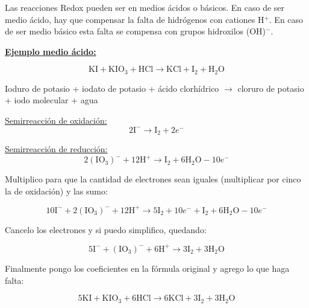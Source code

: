 Las reacciones Redox pueden ser en medios ácidos o básicos. En caso de ser medio ácido, hay que compensar la falta de hidrógenos con cationes H$^+$. En caso de ser medio básico esta falta se compensa con grupos hidroxilos (OH)$^-$.

\skipline
\noindent\textbf{\underline{Ejemplo medio ácido:}}

$$\text{KI} + \text{K} \text{I} \text{O}_3 + \text{H} \text{Cl} \longrightarrow
\text{KCl} + \text{I}_2 +  \text{H}_2 \text{O}$$

\hfil Ioduro de potasio \hfil + \hfil iodato de potasio \hfil + \hfil ácido clorhídrico \hfil
$\rightarrow$ \hfil
cloruro de potasio \hfil + \hfil iodo molecular \hfil + \hfil agua \hfil 

\begin{multicols}{2}

\underline{Semirreacción de oxidación:}
$$2\text{I}^{-} \longrightarrow \text{I}_2 + 2e^-$$

\underline{Semirreacción de reducción:}
$$2(\text{IO}_3)^{-} + 12 \text{H}^+ \longrightarrow \text{I}_2 + 6\text{H}_2 \text{O} - 10e^-$$
\end{multicols}

Multiplico para que la cantidad de electrones sean iguales (multiplicar por cinco la de oxidación) y las sumo:

$$10\text{I}^{-} + 2(\text{IO}_3)^{-} + 12 \text{H}^+ \longrightarrow 5 \text{I}_2 + 10 e^- + \text{I}_2 + 6\text{H}_2 \text{O} - 10e^-$$

Cancelo los electrones y si puedo simplifico, quedando:

$$5\text{I}^{-} + (\text{IO}_3)^{-} + 6 \text{H}^+ \longrightarrow 3 \text{I}_2 + 3\text{H}_2 \text{O}$$

Finalmente pongo los coeficientes en la fórmula original y agrego lo que haga falta:

$$5\text{KI} + \text{K} \text{I} \text{O}_3 + 6\text{H} \text{Cl} \longrightarrow
6\text{KCl} + 3\text{I}_2 +  3\text{H}_2 \text{O}$$
